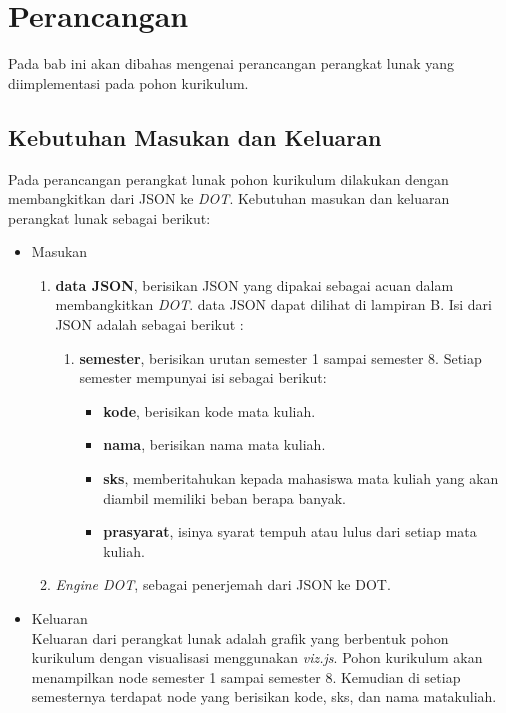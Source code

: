 \chapter{Perancangan}
\label{chap: Perancangan}

Pada bab ini akan dibahas mengenai perancangan perangkat lunak yang diimplementasi pada pohon kurikulum.

\section{Kebutuhan Masukan dan Keluaran}
\label{sec: Kebutuhan Masukan dan Keluaran}
Pada perancangan perangkat lunak pohon kurikulum dilakukan dengan membangkitkan dari JSON ke \textit{DOT}. Kebutuhan masukan dan keluaran perangkat lunak sebagai berikut:
\begin{itemize}
\item Masukan 
\begin{enumerate}
\item \textbf{data JSON}, berisikan JSON yang dipakai sebagai acuan dalam membangkitkan \textit{DOT}. data JSON dapat dilihat di lampiran B. Isi dari JSON adalah sebagai berikut :

\begin{enumerate}
\item \textbf{semester}, berisikan urutan semester 1 sampai semester 8. Setiap semester mempunyai isi sebagai berikut: 
\begin{itemize}
\item \textbf{kode}, berisikan kode mata kuliah.
\item \textbf{nama}, berisikan nama mata kuliah.
\item \textbf{sks}, memberitahukan kepada mahasiswa mata kuliah yang akan diambil memiliki beban berapa banyak.
\item \textbf{prasyarat}, isinya syarat tempuh atau lulus dari setiap mata kuliah.
\end{itemize}

\end{enumerate}

\item \textit{Engine DOT}, sebagai penerjemah dari JSON ke DOT.
\end{enumerate}

\item Keluaran\\
Keluaran dari perangkat lunak adalah grafik yang berbentuk pohon kurikulum dengan visualisasi menggunakan \textit{viz.js}. Pohon kurikulum akan menampilkan node semester 1 sampai semester 8. Kemudian di setiap semesternya terdapat node yang berisikan kode, sks, dan nama matakuliah. 
\end{itemize}

